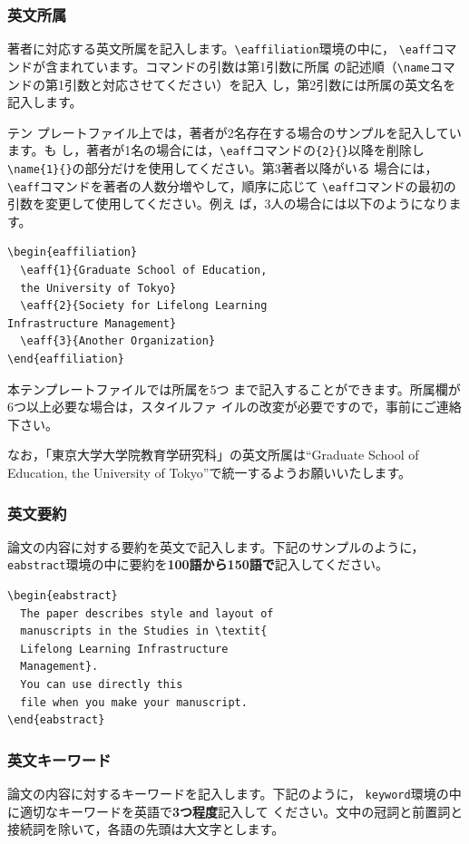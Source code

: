 \documentclass[b5paper,10pt,twocolumn,tombow]{jarticle}
\begin{document}
\subsubsection{英文所属}
著者に対応する英文所属を記入します。\verb|\eaffiliation|環境の中に，
\verb|\eaff|コマンドが含まれています。コマンドの引数は第1引数に所属
の記述順（\verb|\name|コマンドの第1引数と対応させてください）を記入
し，第2引数には所属の英文名を記入します。


テン
プレートファイル上では，著者が2名存在する場合のサンプルを記入しています。も
し，著者が1名の場合には，\verb|\eaff|コマンドの\verb|{2}{}|以降を削除し
\verb|\name{1}{}|の部分だけを使用してください。第3著者以降がいる
場合には，\verb|\eaff|コマンドを著者の人数分増やして，順序に応じて
\verb|\eaff|コマンドの最初の引数を変更して使用してください。例え
ば，3人の場合には以下のようになります。

\begin{verbatim}
\begin{eaffiliation}
  \eaff{1}{Graduate School of Education,
  the University of Tokyo}
  \eaff{2}{Society for Lifelong Learning
Infrastructure Management}
  \eaff{3}{Another Organization}
\end{eaffiliation}
\end{verbatim}
本テンプレートファイルでは所属を5つ
まで記入することができます。所属欄が6つ以上必要な場合は，スタイルファ
イルの改変が必要ですので，事前にご連絡下さい。

なお，「東京大学大学院教育学研究科」の英文所属は``Graduate School of
Education, the University of
Tokyo''で統一するようお願いいたします。

\subsubsection{英文要約}
論文の内容に対する要約を英文で記入します。下記のサンプルのように，
\texttt{eabstract}環境の中に要約を\textbf{100語から150語で}記入してください。


\begin{verbatim}
\begin{eabstract}
  The paper describes style and layout of
  manuscripts in the Studies in \textit{
  Lifelong Learning Infrastructure
  Management}.
  You can use directly this
  file when you make your manuscript.
\end{eabstract}
\end{verbatim}


\subsubsection{英文キーワード}
論文の内容に対するキーワードを記入します。下記のように，
\texttt{keyword}環境の中に適切なキーワードを英語で\textbf{3つ程度}記入して
ください。文中の冠詞と前置詞と接続詞を除いて，各語の先頭は大文字とします。
\end{document}
